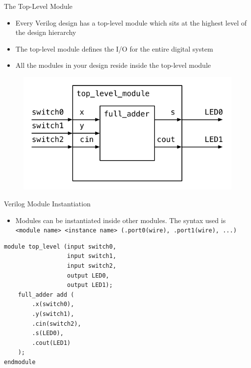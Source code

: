 \documentclass{beamer}
\begin{document}
\begin{frame}{The Top-Level Module}
	\begin{itemize}
		\item Every Verilog design has a top-level module which sits at the highest level of the design hierarchy
		\item The top-level module defines the I/O for the entire digital system
		\item All the modules in your design reside inside the top-level module
	\end{itemize}
	\begin{figure}
	\centering
	\includegraphics{top_level.pdf}
	\end{figure}
\end{frame}

\begin{frame}[fragile]{Verilog Module Instantiation}
	\begin{itemize}
		\item Modules can be instantiated inside other modules. The syntax used is \small \texttt{<module name> <instance name> (.port0(wire), .port1(wire), ...)}\normalsize
	\end{itemize}
\begin{verbatim}
module top_level (input switch0,
                  input switch1,
                  input switch2,
                  output LED0,
                  output LED1);
	full_adder add (
		.x(switch0),
		.y(switch1),
		.cin(switch2),
		.s(LED0),
		.cout(LED1)
	);
endmodule
\end{verbatim}
\end{frame}
\end{document}
